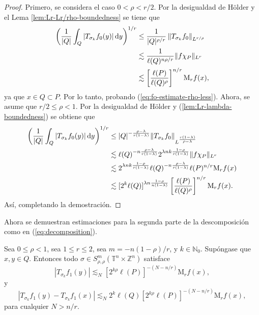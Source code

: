 \begin{proof}
	Primero, se considera el caso $0<\rho<r/2$. Por la desigualdad de H\"older y el Lema \ref{lem:Lr-Lr/rho-boundedness} se tiene que 
	\begin{align*}
		\left(
		\frac{1}{|Q|} \int_Q |T_{\sigma_k}f_0(y)|\mathop{}\!\mathrm{d} y
		\right)^{1/r} &\leq \frac{1}{|Q|^{\rho/r}} \left\| T_{\sigma_k}f_0  \right\|_{L^{r/\rho}} \\
		& \lesssim \frac{1}{\ell(Q)^{n\rho/r}} \|f \chi_P \|_{L^r} \\
		& \lesssim \left[ \frac{\ell(P)}{\ell(Q)^\rho} 
		\right]^{n/r} \mathrm{M}_rf(x),
	\end{align*}
	ya que $x \in Q \subset P$. Por lo tanto, probando (\ref{eq:fo-estimate-rho-less}). Ahora, se asume que $r/2\leq \rho<1$. Por la desigualdad de H\"older y (\ref{lem:Lr-lambda-boundedness}) se obtiene que 
	\begin{align*}
		\left(
		\frac{1}{|Q|} \int_Q |T_{\sigma_k}f_0(y)|\mathop{}\!\mathrm{d} y
		\right)^{1/r} &\leq {|Q|^{-\frac{\rho-\lambda}{r(1-\lambda)}}} \|T_{\sigma_k}f_0\|_{L^\frac{r(1-\lambda)}{\rho-\lambda}} \\
		&\lesssim {\ell(Q)^{-n\frac{\rho-\lambda}{r(1-\lambda)}}} 2^{\lambda nk\frac{1-\rho}{r(1-\lambda)}} \|f\chi_P\|_{L^r}  \\
		& \lesssim 2^{\lambda nk\frac{1-\rho}{r(1-\lambda)}}\ell(Q)^{-n\frac{\rho-\lambda}{r(1-\lambda)}} \ell(P)^{n/r} \mathrm{M}_rf(x)\\
		&\lesssim[2^k\ell(Q)]^{\lambda n\frac{1-\rho}{n(1-\lambda)}} 
		\left[ \frac{\ell(P)}{\ell(Q)^\rho}
		\right]^{n/r} \mathrm{M}_rf(x).
	\end{align*}
	Así, completando la demostración.
\end{proof}
Ahora se demuestran estimaciones para la segunda parte de la descomposición como en (\ref{eq:decomposition}).
\begin{proposition}
	Sea $0\leq \rho<1$, sea $1\leq r\leq2$, sea $m=-n(1-\rho)/r$, y $k\in\mathbb{N}_0$. Supóngase que $x, y \in Q$. Entonces todo $\sigma \in S^m_{\rho,\rho}(\mathbb{T}^n \times \mathbb{Z}^n) $ satisface
	\begin{equation}
		|T_{\sigma_k}f_1(y)| \lesssim_N [2^{k\rho}\ell(P)]^{-(N-n/r)} \mathrm{M}_rf(x),
		\label{eq:f1-estimate}
	\end{equation}
	y
	\begin{equation}
		|T_{\sigma_k}f_1(y) - T_{\sigma_k}f_1(x)| \lesssim_N 2^k\ell(Q) [2^{k\rho}\ell(P)]^{-(N-n/r)} \mathrm{M}_rf(x),
		\label{eq:diff-f1}
	\end{equation}
	para cualquier $N>n/r$.
\end{proposition}
